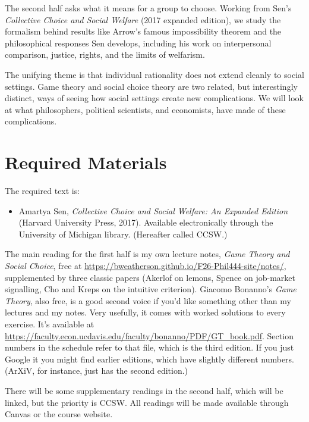 \documentclass[
  letterpaper,
  DIV=11,
  numbers=noendperiod]{scrartcl}
\providecommand{\tightlist}{%
  \setlength{\itemsep}{0pt}\setlength{\parskip}{0pt}}
\begin{document}
The second half asks what it means for a group to choose. Working from
Sen's \emph{Collective Choice and Social Welfare} (2017 expanded
edition), we study the formalism behind results like Arrow's famous
impossibility theorem and the philosophical responses Sen develops,
including his work on interpersonal comparison, justice, rights, and the
limits of welfarism.

The unifying theme is that individual rationality does not extend
cleanly to social settings. Game theory and social choice theory are two
related, but interestingly distinct, ways of seeing how social settings
create new complications. We will look at what philosophers, political
scientists, and economists, have made of these complications.

\section{Required Materials}\label{required-materials}

The required text is:

\begin{itemize}
\tightlist
\item
  Amartya Sen, \emph{Collective Choice and Social Welfare: An Expanded
  Edition} (Harvard University Press, 2017). Available electronically
  through the University of Michigan library. (Hereafter called CCSW.)
\end{itemize}

The main reading for the first half is my own lecture notes, \emph{Game
Theory and Social Choice}, free at
\url{https://bweatherson.github.io/F26-Phil444-site/notes/},
supplemented by three classic papers (Akerlof on lemons, Spence on
job-market signalling, Cho and Kreps on the intuitive criterion).
Giacomo Bonanno's \emph{Game Theory}, also free, is a good second voice
if you'd like something other than my lectures and my notes. Very
usefully, it comes with worked solutions to every exercise. It's
available at
\url{https://faculty.econ.ucdavis.edu/faculty/bonanno/PDF/GT_book.pdf}.
Section numbers in the schedule refer to that file, which is the third
edition. If you just Google it you might find earlier editions, which
have slightly different numbers. (ArXiV, for instance, just has the
second edition.)

There will be some supplementary readings in the second half, which will
be linked, but the priority is CCSW. All readings will be made available
through Canvas or the course website.
\end{document}
